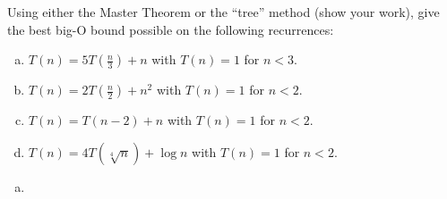 \documentclass{article}
\begin{document}
\begin{exercise}[subtitle={Recurrence Relations (6 pts)}]
Using either the Master Theorem or the ``tree'' method (show your work), give the best big-O bound possible on the following recurrences:
\begin{enumerate}[(a)]
\item $T(n) = 5T(\frac{n}{3}) + n$ with $T(n) = 1$ for $n<3$.
\item $T(n) = 2T(\frac{n}{2}) + n^2$ with $T(n) = 1$ for $n<2$.
\item $T(n) = T(n-2) + n$  with $T(n) = 1$ for $n<2$.
\item $T(n) = 4T(\sqrt[4]{n}) + \log n$ with $T(n) = 1$ for $n<2$.
\end{enumerate}
\end{exercise}
\begin{solution}
	\begin{mdframed}
	\begin{enumerate}[(a)]
	\item 
	\end{enumerate}
	\end{mdframed}
\end{solution}
\end{document}

